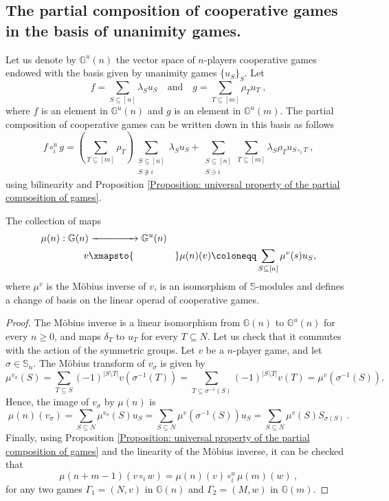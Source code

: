 \documentclass[a4paper,12pt]{amsart}
\begin{document}
\subsection{The partial composition of cooperative games in the basis of unanimity games.}\label{subsection: unanimity basis} Let us denote by $\mathbb{G}^{u}(n)$ the vector space of $n$-players cooperative games endowed with the basis given by unanimity games $\{u_S\}_S$. Let 
\[
f = \sum_{S \subseteq [n]} \lambda_S u_S \quad \text{and} \quad g = \sum_{T \subseteq [m]} \rho_T u_T~,
\]
where $f$ is an element in $\mathbb{G}^{u}(n)$ and $g$ is an element in $\mathbb{G}^{u}(m)$. The partial composition of cooperative games can be written down in this basis as follows 
\[
f \circ_i^{u} g = \left(\sum_{T \subseteq [m]} \rho_T\right)\sum_{\substack{S \subseteq [n] \\ S \not \ni i}} \lambda_S u_S + \sum_{\substack{S \subseteq [n] \\ S \ni i}} \sum_{T \subseteq [m]} \lambda_{S}\rho_T u_{S \circ_i T}~,
\]
using bilinearity and Proposition \ref{Proposition: universal property of the partial composition of games}.

\begin{proposition}\label{prop: Mobius changes the basis}
The collection of maps 
\[ \begin{aligned} 
\mu(n): \mathbb{G}(n) & \xrightarrow{\hspace{1.5cm}} \mathbb{G}^u(n) \\
v & \xmapsto{\hspace{1.5cm}} \mu(n)(v) \coloneqq \sum_{S \subseteq [n]} \mu^v(s) u_S, 
\end{aligned} \]
where $\mu^v$ is the M{\"o}bius inverse of $v$, is an isomorphism of $\mathbb{S}$-modules and defines a change of basis on the linear operad of cooperative games. 
\end{proposition}

\begin{proof}
The M{\"o}bius inverse is a linear isomorphism from $\mathbb{G}(n)$ to $\mathbb{G}^{u}(n)$ for every $n \geq 0$, and maps $\delta_T$ to $u_T$ for every $T \subseteq N$. Let us check that it commutes with the action of the symmetric groups. Let $v$ be a $n$-player game, and let $\sigma \in \mathbb{S}_n$. The M{\"o}bius transform of $v_\sigma$ is given by 
\[
\mu^{v_\sigma}(S) = \sum_{T \subseteq S} (-1)^{\lvert S \setminus T \rvert} v(\sigma^{-1}(T)) = \sum_{T \subseteq \sigma^{-1}(S)} (-1)^{\lvert S \setminus T \rvert} v(T) = \mu^v(\sigma^{-1}(S)). 
\]
Hence, the image of $v_\sigma$ by $\mu(n)$ is
\[ 
\mu(n)(v_\sigma) = \sum_{S \subseteq N} \mu^{v_\sigma}(S) u_S = \sum_{S \subseteq N} \mu^v(\sigma^{-1}(S)) u_S = \sum_{S \subseteq N} \mu^v(S) S_{\sigma(S)} ~. 
\]
Finally, using Proposition \ref{Proposition: universal property of the partial composition of games} and the linearity of the M{\"o}bius inverse, it can be checked that
\[
\mu(n+m-1)(v \circ_i w) = \mu(n)(v) \circ_i^{u} \mu(m)(w)~, 
\]
for any two games $\Gamma_1 = (N,v)$ in $\mathbb{G}(n)$ and $\Gamma_2 = (M,w)$ in $\mathbb{G}(m)$. 
\end{proof}
\end{document}
